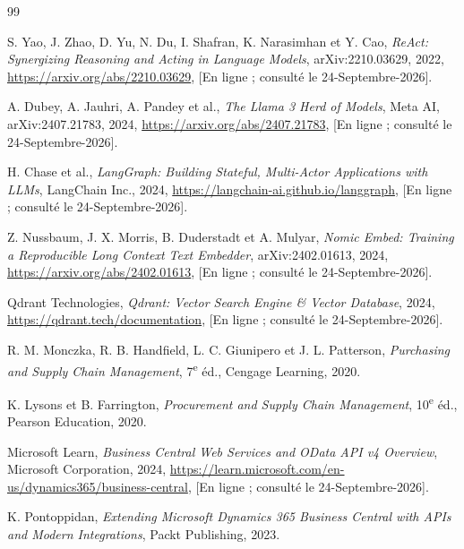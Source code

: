 \begin{thebibliography}{99}

 S. Yao, J. Zhao, D. Yu, N. Du, I. Shafran, K. Narasimhan et Y. Cao, \textit{ReAct: Synergizing Reasoning and Acting in Language Models}, arXiv:2210.03629, 2022, \href{https://arxiv.org/abs/2210.03629}{https://arxiv.org/abs/2210.03629}, [En ligne ; consult\'{e} le 24-Septembre-2026].

 A. Dubey, A. Jauhri, A. Pandey et al., \textit{The Llama 3 Herd of Models}, Meta AI, arXiv:2407.21783, 2024, \href{https://arxiv.org/abs/2407.21783}{https://arxiv.org/abs/2407.21783}, [En ligne ; consult\'{e} le 24-Septembre-2026].

 H. Chase et al., \textit{LangGraph: Building Stateful, Multi-Actor Applications with LLMs}, LangChain Inc., 2024, \href{https://langchain-ai.github.io/langgraph}{https://langchain-ai.github.io/langgraph}, [En ligne ; consult\'{e} le 24-Septembre-2026].

 Z. Nussbaum, J. X. Morris, B. Duderstadt et A. Mulyar, \textit{Nomic Embed: Training a Reproducible Long Context Text Embedder}, arXiv:2402.01613, 2024, \href{https://arxiv.org/abs/2402.01613}{https://arxiv.org/abs/2402.01613}, [En ligne ; consult\'{e} le 24-Septembre-2026].

 Qdrant Technologies, \textit{Qdrant: Vector Search Engine \& Vector Database}, 2024, \href{https://qdrant.tech/documentation}{https://qdrant.tech/documentation}, [En ligne ; consult\'{e} le 24-Septembre-2026].

 R. M. Monczka, R. B. Handfield, L. C. Giunipero et J. L. Patterson, \textit{Purchasing and Supply Chain Management}, 7\textsuperscript{e} \'{e}d., Cengage Learning, 2020.

 K. Lysons et B. Farrington, \textit{Procurement and Supply Chain Management}, 10\textsuperscript{e} \'{e}d., Pearson Education, 2020.

 Microsoft Learn, \textit{Business Central Web Services and OData API v4 Overview}, Microsoft Corporation, 2024, \href{https://learn.microsoft.com/en-us/dynamics365/business-central}{https://learn.microsoft.com/en-us/dynamics365/business-central}, [En ligne ; consult\'{e} le 24-Septembre-2026].

 K. Pontoppidan, \textit{Extending Microsoft Dynamics 365 Business Central with APIs and Modern Integrations}, Packt Publishing, 2023.


\end{thebibliography}
